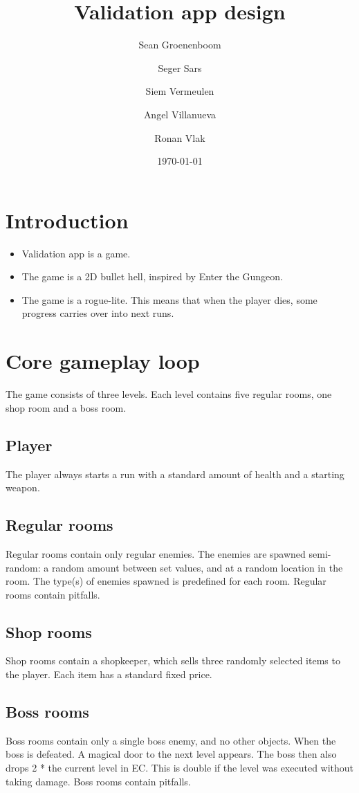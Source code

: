 \documentclass{article}
\title{Validation app design}
\author{Sean Groenenboom \and Seger Sars \and Siem Vermeulen \and Angel Villanueva \and Ronan Vlak} %
\date{\today} %
\begin{document}
\maketitle %

\section{Introduction}
\begin{itemize}
    \item Validation app is a game.
    \item The game is a 2D bullet hell, inspired by Enter the Gungeon.
    \item The game is a rogue-lite. This means that when the player dies, some progress carries over into next runs.
\end{itemize}

\section{Core gameplay loop}
The game consists of three levels.
Each level contains five regular rooms, one shop room and a boss room.

\subsection{Player}
The player always starts a run with a standard amount of health and a starting weapon.

\subsection{Regular rooms}
Regular rooms contain only regular enemies.
The enemies are spawned semi-random: a random amount between set values, and at a random location in the room.
The type(s) of enemies spawned is predefined for each room.
Regular rooms contain pitfalls.

\subsection{Shop rooms}
Shop rooms contain a shopkeeper, which sells three randomly selected items to the player.
Each item has a standard fixed price.

\subsection{Boss rooms}
Boss rooms contain only a single boss enemy, and no other objects. 
When the boss is defeated. A magical door to the next level appears.
The boss then also drops 2 * the current level in EC. This is double if the level was executed without taking damage.
Boss rooms contain pitfalls.
\end{document}

